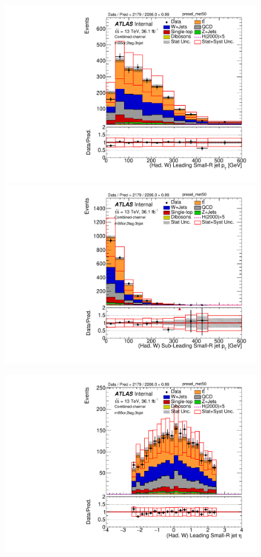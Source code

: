 \begin{figure}[!h]
\begin{center}
\includegraphics[scale=0.33]{./figures/boosted/PlotsInMbbCR/DataMC_2tag_0bjet_mbbcr_lepton_presel_met50_LightJet1Pt}
\includegraphics[scale=0.33]{./figures/boosted/PlotsInMbbCR/DataMC_2tag_0bjet_mbbcr_lepton_presel_met50_LightJet2Pt}\\
\par\medskip
\includegraphics[scale=0.33]{./figures/boosted/PlotsInMbbCR/DataMC_2tag_0bjet_mbbcr_lepton_presel_met50_LightJet1Eta}

\end{center}
\end{figure}
